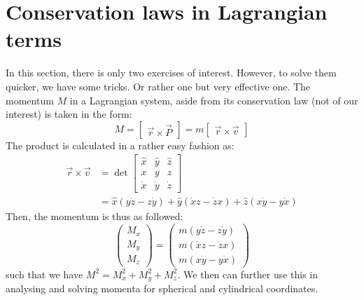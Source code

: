 \section{Conservation laws in Lagrangian terms}
In this section, there is only two exercises of interest. However, to solve them quicker, we have some tricks. Or rather one but very effective one. The momentum $M$ in a Lagrangian system, aside from its conservation law (not of our interest) is taken in the form: 
\begin{equation}
    M = \begin{bmatrix}
        \vec{r} \times \vec{P} 
    \end{bmatrix}
    = m\begin{bmatrix}
       \vec{r} \times \vec{v} 
    \end{bmatrix}
\end{equation}
The product is calculated in a rather easy fashion as: 
\begin{equation}
    \begin{split}
        \vec{r}\times \vec{v} &= \det \begin{bmatrix}
            \hat{x} & \hat{y} & \hat{z}\\
            x & y & z\\
            \dot{x} & \dot{y} & \dot{z}
        \end{bmatrix}\\
        & = \hat{x} \left(y\dot{z}- z\dot{y}\right) + \hat{y} \left(\dot{x}z - \dot{z}x\right) + \hat{z}\left(x\dot{y}-y\dot{x}\right)
    \end{split}
\end{equation}
Then, the momentum is thus as followed: 
\begin{equation}
    \begin{pmatrix}
        M_{x}\\
        M_{y}\\
        M_{z}
    \end{pmatrix}
    =\begin{pmatrix}
        m\left(y\dot{z}- z\dot{y}\right)\\
        m\left(\dot{x}z - \dot{z}x\right)\\
        m\left(x\dot{y}-y\dot{x}\right)
    \end{pmatrix}
\end{equation}
such that we have $M^{2} = M_{x}^{2}+ M_{y}^{2}+ M_{z}^{2}$. We then can further use this in analysing and solving momenta for spherical and cylindrical coordinates. 
